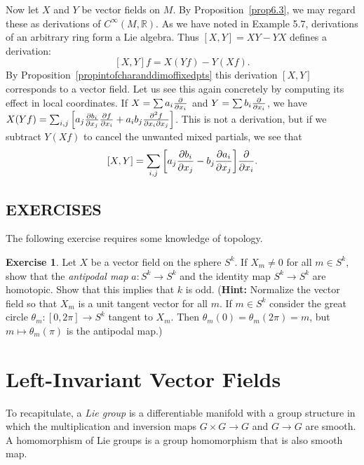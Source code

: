 \documentclass[12pt,reqno]{book}%
\theoremstyle{definition}
\newtheorem{exercise}{Exercise}[chapter]
\theoremstyle{remark}
\theoremstyle{theorem}
\theoremstyle{remark}
\begin{document}
Now let $X$ and $Y$ be vector fields on $M$.
By Proposition~\ref{prop6.3}, we may regard these as derivations of $C^\infty(M, \mathbb{R})$.
As we have noted in Example 5.7, derivations of an arbitrary ring form a Lie algebra.
Thus $[X, Y] = XY - YX$ defines a derivation:
\begin{equation}\label{eqderivation}
    [X, Y]f = X(Yf) - Y(Xf).
\end{equation}
By Proposition~\ref{propintofcharanddimoffixedpts} this derivation $[X, Y]$ corresponds to a vector field.
Let us see this again concretely by computing its effect in local coordinates.
If $X = \sum a_i \pdv{x_i}$ and $Y = \sum b_i \pdv{x_i}$, we have $X(Yf) = \sum_{i, j} {\left[a_j \pdv{b_i}{x_j} \pdv{f}{x_i} + a_ib_j \pdv[2]{f}{x_i}{x_j}\right]}$.
This is not a derivation, but if we subtract $Y(Xf)$ to cancel the unwanted mixed partials, we see that
\[
    [X, Y] = \sum_{i, j} {\left[a_j \pdv{b_i}{x_j} - b_j \pdv{a_i}{x_j}\right]}\pdv{x_i}.
\]

\section*{EXERCISES}%
The following exercise requires some knowledge of topology.

\begin{exercise}\label{}
    Let $X$ be a vector field on the sphere $S^k$.
    If $X_m \neq 0$ for all $m \in S^k$, show that the \emph{antipodal map} $a : S^k \to S^k$ and the identity map $S^k \to S^k$ are homotopic.
    Show that this implies that $k$ is odd.
    (\textbf{Hint:} Normalize the vector field so that $X_m$ is a unit tangent vector for all $m$.
    If $m \in S^k$ consider the great circle $\theta_m : [0, 2\pi] \to S^k$ tangent to $X_m$.
    Then $\theta_m(0) = \theta_m(2\pi) = m$, but $m \mapsto \theta_m(\pi)$ is the antipodal map.)
\end{exercise}


\chapter{Left-Invariant Vector Fields}\label{}%
To recapitulate, a \emph{Lie group} is a differentiable manifold with a group structure in which the multiplication and inversion maps $G \times G \to G$ and $G \to G$ are smooth.
A homomorphism of Lie groups is a group homomorphism that is also smooth map.
\end{document}
